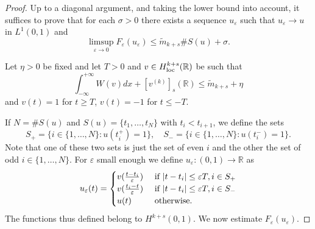 \documentclass{article}
\newcommand{\e}{\varepsilon}
\begin{document}
\begin{proof}
Up to a diagonal argument, and taking the lower bound into account, it suffices to prove that for each $\sigma>0$ there exists a sequence $u_\e$ such that $u_\e\to u$ in $L^1(0,1)$ and 
\begin{equation}
\limsup_{\e\to 0}F_\e(u_\e)\le\widetilde m_{k+s}\#S(u)+\sigma.
\end{equation}

\smallskip
Let $\eta>0$ be fixed and let $T>0$ and $v\in H^{k+s}_{\rm loc} (\mathbb R)$ be such that 
$$
\int_{-\infty}^{+\infty} W(v)dx+[v^{(k)}]_{s}(\mathbb R)\le \widetilde m_{k+s}+\eta
$$
and $v(t)=1$ for $t\ge T$, $v(t)=-1$ for $t\le -T$.

If  $N=\#S(u)$ and $S(u)=\{t_1,\ldots, t_N\}$ with $t_i<t_{i+1}$, we define the sets
$$
S_+=\{i\in\{1,\ldots,N\}: u(t_i^+)=1\},\quad S_-=\{i\in\{1,\ldots,N\}: u(t_i^-)=1\}.
$$
Note that one of these two sets is just the set of even $i$ and the other the set of odd $i\in\{1,\ldots,N\}$.
For $\e$ small enough we define $u_\e\colon(0,1)\to \mathbb R$ as 
$$
u_\e(t)=\begin{cases}
v(\frac{t-t_i}\e) &\hbox{ if }|t-t_i|\le\e T, i\in S_+\\
v(\frac{t_i-t}\e) &\hbox{ if }|t-t_i|\le\e T, i\in S_-\\
u(t) &\hbox{ otherwise.}
\end{cases}
$$
The functions thus defined belong to $H^{k+s}(0,1)$. We now estimate $F_\e(u_\e)$.


\end{proof}
\end{document}
